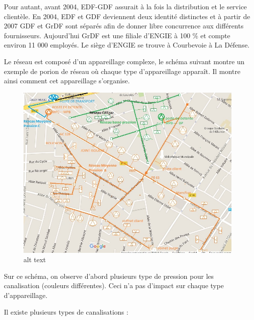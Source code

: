 \documentclass[
12pt,
french,                           %
a4paper,
]{article}
\begin{document}
Pour autant, avant 2004, EDF-GDF assurait à la fois la distribution et
le service clientèle. En 2004, EDF et GDF deviennent deux identité
distinctes et à partir de 2007 GDF et GrDF sont séparés afin de donner
libre concurrence aux différents fournisseurs. Aujourd'hui GrDF est une
filiale d'ENGIE à 100 \% et compte environ 11 000 employés. Le siège
d'ENGIE se trouve à Courbevoie à La Défense.

Le réseau est composé d'un appareillage complexe, le schéma suivant
montre un exemple de porion de réseau où chaque type d'appareillage
apparaît. Il montre ainsi comment cet appareillage s'organise.

\begin{figure}[htbp]
\centering
\includegraphics{carte_gaz.jpg}
\caption{alt text}
\end{figure}

Sur ce schéma, on observe d'abord plusieurs type de pression pour les
canalisation (couleurs différentes). Ceci n'a pas d'impact sur chaque
type d'appareillage.

Il existe plusieurs types de canalisations :
\end{document}
